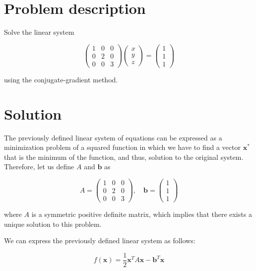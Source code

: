 \documentclass[11pt,a4paper]{article}
\begin{document}
\setlength{\parskip}{1em}


\section{Problem description}

Solve the linear system

\[
  \begin{pmatrix}
    1 & 0 & 0 \\
    0 & 2 & 0 \\
    0 & 0 & 3
  \end{pmatrix}
  \begin{pmatrix}
    x \\
    y \\
    z
  \end{pmatrix}
  =
  \begin{pmatrix}
    1 \\
    1 \\
    1
  \end{pmatrix}
\]

\noindent using the conjugate-gradient method.

\section{Solution}

The previously defined linear system of equations can be expressed as a minimization problem of a
squared function in which we have to find a vector $\mathbf{x}^*$ that is the minimum
of the function, and thus, solution to the original system. Therefore, let us define
$A$ and $\mathbf{b}$ as

\[
  A =
  \begin{pmatrix}
    1 & 0 & 0 \\
    0 & 2 & 0 \\
    0 & 0 & 3
  \end{pmatrix}
  ,\quad
  \mathbf{b} =
  \begin{pmatrix}
    1 \\
    1 \\
    1
  \end{pmatrix}
\]

\noindent where $A$ is a symmetric positive definite matrix, which implies that there
exists a unique solution to this problem.

We can express the previously defined linear system as follows:

\[
  f(\mathbf{x}) = \frac{1}{2} \mathbf{x}^TA\mathbf{x} - \mathbf{b}^T\mathbf{x}
\]
\end{document}
